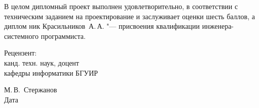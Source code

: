 \begin{singlespace}
{В целом дипломный проект выполнен удовлетворительно, в соответствии с техническим заданием на проектирование и заслуживает оценки шесть баллов, а диплом
ник Красильников~А.\,А. "--- присвоения квалификации инженера-системного программиста.
 
 \vfill
 \noindent
 \begin{minipage}{0.4\textwidth}
   \begin{flushleft}
     Рецензент:\\
     канд. техн. наук, доцент\\
     кафедры информатики БГУИР
   \end{flushleft}
 \end{minipage}
 \begin{minipage}{0.58\textwidth}
   \begin{flushright}
   \underline{\hspace*{3cm}}\hspace*{0.5cm}\underline{\hspace*{2cm}} М.\,В.~Стержанов \\
   Дата\hspace*{6.5cm}
   \end{flushright}
 \end{minipage}
}
 
\end{singlespace}
\clearpage

